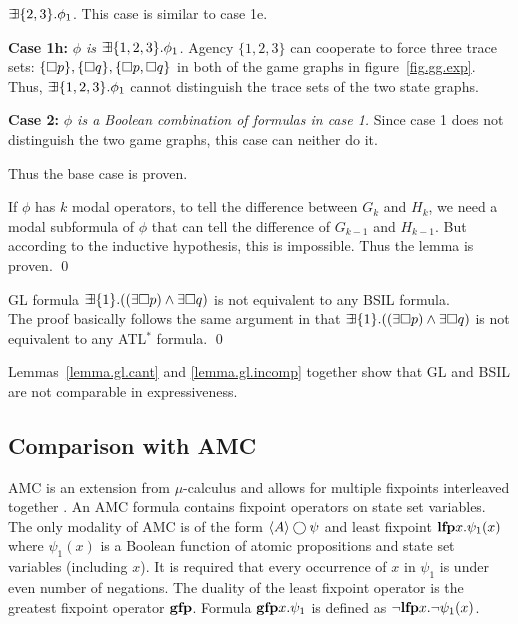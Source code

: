 \begin{list1}
\begin{list2}
{        $\mbox{$\exists\!\!\exists$}\{2,3\}.\phi_1$.}
        This case is similar to case 1e.
    \item {\bf Case 1h:} {\em $\phi$ is
        $\mbox{$\exists\!\!\exists$}\{1,2,3\}.\phi_1$.}
        Agency $\{1, 2,3\}$ can cooperate to force three trace sets:
        $\{\Box p\}, \{\Box q\}, \{\Box p,\Box q\}$
        in both of the game graphs in figure~\ref{fig.gg.exp}.
        Thus, $\mbox{$\exists\!\!\exists$}\{1,2,3\}.\phi_1$ cannot distinguish the trace sets of the
        two state graphs.
    \end{list2}
\item {\bf Case 2:} {\em $\phi$ is a Boolean combination of
    formulas in case 1.}
    Since case 1 does not distinguish the two game graphs, 
    this case can neither do it.  
\end{list1}
Thus the base case is proven.

If $\phi$ has $k$ modal operators,
to tell the difference between $G_k$ and $H_k$,
we need a modal subformula of $\phi$ that can tell the difference
of $G_{k-1}$ and $H_{k-1}$.
But according to the inductive hypothesis, this is impossible.
Thus the lemma is proven.  
\qed 



{\lemma \label{lemma.gl.incomp}
GL formula $\mbox{$\exists\!\!\exists$}\{1\}.((\exists\Box p)\wedge\exists\Box q)$
is not equivalent to any BSIL formula.
}
\\\pf The proof basically follows the same argument in \cite{AHK02} 
that $\mbox{$\exists\!\!\exists$}\{1\}.((\exists\Box p)\wedge\exists\Box q)$ 
is not equivalent to 
any ATL$^*$ formula.  
\qed 

Lemmas~\ref{lemma.gl.cant} and 
\ref{lemma.gl.incomp} together show that 
GL and BSIL are not comparable in expressiveness.  
\subsection{Comparison with AMC}
AMC is an extension from $\mu$-calculus and allows 
for multiple fixpoints interleaved together \cite{AHK02}.  
An AMC formula contains fixpoint operators on state set variables.  
The only modality of AMC is of the form $\langle A\rangle\bigcirc\psi$ 
and least fixpoint $\mbox{\bf lfp} x.\psi_1(x)$ where 
$\psi_1(x)$ is a Boolean function of atomic propositions 
and state set variables (including $x$).  
It is required that every occurrence of $x$ in $\psi_1$ is 
under even number of negations.  
The duality of the least fixpoint operator is the greatest fixpoint 
operator $\mbox{\bf gfp}$.  
Formula $\mbox{\bf gfp} x.\psi_1$ is defined as $\neg\mbox{\bf lfp} x.\neg\psi_1(x)$.  


